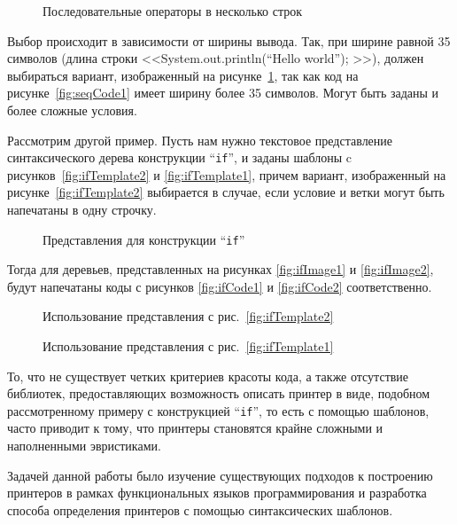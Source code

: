 \begin{figure}[h!]
	\centering
	
	\caption{Последовательные операторы в несколько строк}
	\label{fig:seqCode2}
\end{figure}

Выбор происходит в зависимости от ширины вывода. Так, при ширине равной 35 символов (длина строки <<System.out.println(“Hello world”); >>), должен выбираться вариант, изображенный на рисунке~\ref{fig:seqCode2}, так как код на рисунке~\ref{fig:seqCode1} имеет ширину более 35 символов.
Могут быть заданы и более сложные условия.

Рассмотрим другой пример. Пусть нам нужно текстовое представление синтаксического дерева конструкции “\lstinline{if}”, и заданы шаблоны c рисунков~\ref{fig:ifTemplate2} и \ref{fig:ifTemplate1}, причем вариант, изображенный на рисунке~\ref{fig:ifTemplate2} выбирается в случае, если условие и ветки могут быть напечатаны в одну строчку.

\begin{figure}[h!]
	\subfloat[]{
		
		\label{fig:ifTemplate2}	
	}
	\quad
	\subfloat[]{
		
		\label{fig:ifTemplate1}	
	}
	\caption{Представления для конструкции “\lstinline{if}”}
\end{figure}


Тогда для деревьев, представленных на рисунках \ref{fig:ifImage1} и \ref{fig:ifImage2}, будут напечатаны коды с рисунков \ref{fig:ifCode1} и \ref{fig:ifCode2} соответственно.

\begin{figure}[h!]
	\subfloat[]{
		\centering
		\texttt{[image: if1]}
		\label{fig:ifImage1}
	}
	\quad
	\subfloat[]{
		\centering
		
		\label{fig:ifCode1}	
	}

	\caption{Использование представления с рис.~\ref{fig:ifTemplate2}}
\end{figure}

\begin{figure}[h!]
	\subfloat[]{
		\centering
		\texttt{[image: if2]}
		\label{fig:ifImage2}	
	}
	\quad
	\subfloat[]{
		\centering
		
		\label{fig:ifCode2}	
	}

	\caption{Использование представления с рис.~\ref{fig:ifTemplate1}}
\end{figure}

То, что не существует четких критериев красоты кода, а также отсутствие библиотек, предоставляющих возможность описать принтер в виде, подобном
рассмотренному примеру с конструкцией “\lstinline{if}”, то есть с помощью шаблонов, часто приводит к тому, что принтеры становятся крайне сложными и наполненными эвристиками.

Задачей данной работы было изучение существующих подходов к построению принтеров в рамках функциональных языков программирования и разработка способа определения принтеров с помощью синтаксических шаблонов.
